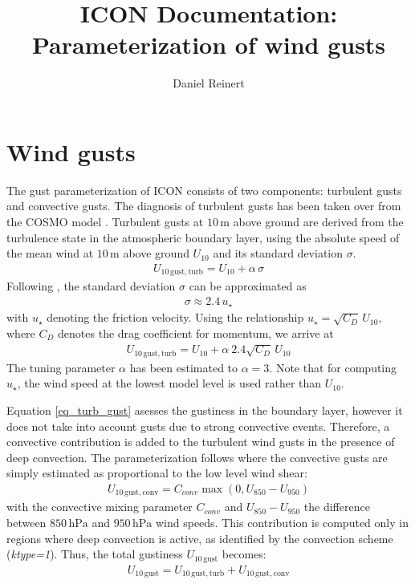 \documentclass[a4paper,11pt]{article}
\author{Daniel Reinert}
\title{ICON Documentation: Parameterization of wind gusts}
\begin{document}
  \maketitle



\section{Wind gusts}

The gust parameterization of ICON consists of two components: turbulent gusts and convective gusts. The diagnosis of turbulent gusts has been taken over from the COSMO 
model \citep{Schulz:2003,Schulz:2008}. Turbulent gusts at $10\,\mathrm{m}$ above ground are derived from the turbulence state in the atmospheric boundary layer, using the absolute speed 
of the mean wind at $10\,\mathrm{m}$ above ground $U_{10}$ and its standard deviation $\sigma$.
\begin{align}
 U_{10\,\mathrm{gust, turb}} = U_{10} + \alpha\, \sigma
\end{align}
Following \cite{Panofsky:1984}, the standard deviation $\sigma$ can be approximated as
\begin{align*}
 \sigma \approx 2.4\,u_{\star}
\end{align*}
with $u_{\star}$ denoting the friction velocity. Using the relationship $u_{\star}=\sqrt{C_{D}}\,U_{10}$, where $C_{D}$ denotes the drag coefficient for momentum, we 
arrive at
\begin{align}
 U_{10\,\mathrm{gust, turb}} = U_{10} + \alpha\ 2.4 \sqrt{C_{D}}\,U_{10} \label{eq_turb_gust}
\end{align}
The tuning parameter $\alpha$ has been estimated to $\alpha=3$. Note that for computing $u_{\star}$, the wind speed at the lowest model level is used rather 
than $U_{10}$.

Equation \eqref{eq_turb_gust} asesses the gustiness in the boundary layer, however it does not take into account gusts due to strong convective events. Therefore, a 
convective contribution is added to the turbulent wind gusts in the presence of deep convection. The parameterization follows \cite{Bechthold:2009} where the convective gusts 
are simply estimated as proportional to the low level wind shear:
\begin{align}
U_{10\,\mathrm{gust, conv}} = C_{conv} \max{(0,U_{850} - U_{950})} 
\end{align}
with the convective mixing parameter $C_{conv}$ and $U_{850} - U_{950}$ the difference between $850\,\mathrm{hPa}$ and $950\,\mathrm{hPa}$ wind speeds. This contribution 
is computed only in regions where deep convection is active, as identified by the convection scheme (\emph{ktype=1}). Thus, the total gustiness 
$U_{10\,\mathrm{gust}}$ becomes:
\begin{align}
  U_{10\,\mathrm{gust}} = U_{10\,\mathrm{gust, turb}} + U_{10\,\mathrm{gust, conv}}
\end{align}
\end{document}
